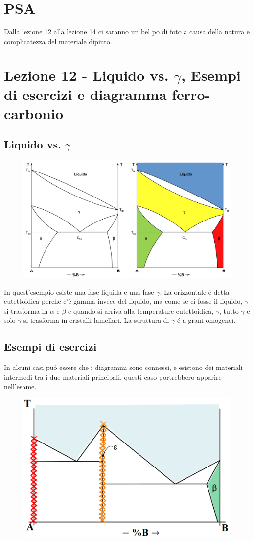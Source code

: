 \documentclass{article}
\begin{document}
{    \section{PSA}
        Dalla lezione 12 alla lezione 14 ci saranno un bel po di foto a causa della natura e complicatezza del materiale dipinto.
    \section{Lezione 12 - Liquido vs. $\gamma$, Esempi di esercizi e diagramma ferro-carbonio}
        \subsection{Liquido vs. $\gamma$}
            \begin{figure}[h!]
                \centering
                \includegraphics[width=.85\linewidth]{L12 - Diagramma con gamma e Liquido.png}
            \end{figure}
            In quest'esempio esiste una fase liquida e una fase $\gamma$. La orizzontale \'e detta eutettoidica perche c'\'e gamma invece del liquido, ma come se ci fosse il liquido, $\gamma$ si trasforma in $\alpha$ e $\beta$ e quando si arriva alla temperature eutettoidica, $\gamma$, tutto $\gamma$ e solo $\gamma$ si trasforma in cristalli lamellari. La struttura di $\gamma$ \'e a grani omogenei.
        \subsection{Esempi di esercizi}
            In alcuni casi pu\'o essere che i diagrammi sono connessi, e esistono dei materiali intermedi tra i due materiali principali, questi caso portrebbero apparire nell'esame.
            \begin{figure}[h!]
                \centering
                \includegraphics[width=.75\linewidth]{L12 - Esempio di esercizio possibileper l'esame.png}
            \end{figure}
        \newpage
}
\end{document}
